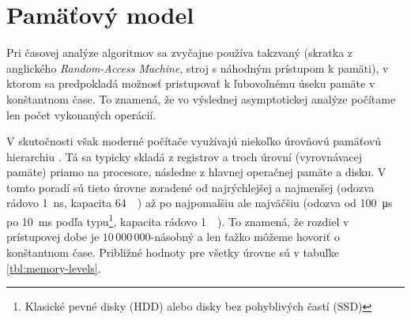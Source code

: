 \chapter{Pamäťový model}

Pri časovej analýze algoritmov sa zvyčajne používa takzvaný \RAM {}(skratka z anglického \emph{Random-Access Machine}, stroj s náhodným prístupom k pamäti), v ktorom sa predpokladá možnosť pristupovať k ľubovoľnému úseku pamäte v konštantnom čase. To znamená, že vo výslednej asymptotickej analýze počítame len počet vykonaných operácií.

V skutočnosti však moderné počítače využívajú niekoľko úrovňovú pamäťovú hierarchiu \citep{drepper2007every}. Tá sa typicky skladá z registrov a troch úrovní \cache (vyrovnávacej pamäte) priamo na procesore, následne z hlavnej operačnej pamäte a disku. V tomto poradí sú tieto úrovne zoradené od najrýchlejšej a najmenšej (odozva rádovo \SI{1}{\nano\second}, kapacita \SI{64}{\kibi\byte}) až po najpomalšiu ale najväčšiu (odozva od \SI{100}{\micro\second} po \SI{10}{\milli\second} podľa typu\footnote{Klasické pevné disky (HDD) alebo disky bez pohyblivých častí (SSD)}, kapacita rádovo \SI{1}{\tebi\byte}). To znamená, že rozdiel v prístupovej dobe je $10\,000\,000$-násobný a len ťažko môžeme hovoriť o konštantnom čase. Približné hodnoty pre všetky úrovne sú v tabuľke \ref{tbl:memory-levels}.

